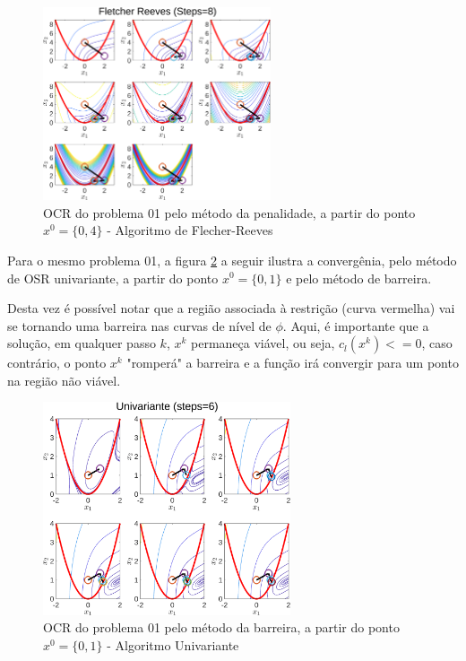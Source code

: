 \documentclass[10pt, a4paper]{article}
\begin{document}
\begin{figure}[H]
      \centering
      \includegraphics[width=0.6\textwidth]{fig02_P01_PEN_X2_FR.png}
      \caption{OCR do problema 01 pelo m\'etodo da penalidade, a partir do ponto $x^0=\{0,4\}$ - Algoritmo de Flecher-Reeves}
      \label{fig:fig02}
\end{figure}

Para o mesmo problema 01, a figura \ref{fig:fig03} a seguir ilustra a converg\^enia, pelo m\'etodo de OSR univariante, a partir do ponto $x^0=\{0,1\}$ e pelo m\'etodo de barreira.

Desta vez \'e poss\'ivel notar que a regi\~ao associada \`a restri\c c\~ao (curva vermelha) vai se tornando uma barreira nas curvas de n\'ivel de $\phi$. Aqui, \'e importante que a solu\c c\~ao, em qualquer passo $k$, $x^k$ permane\c ca vi\'avel, ou seja, $c_l(x^k)<=0$, caso contr\'ario, o ponto $x^k$ "romper\'a" a barreira e a fun\c c\~ao ir\'a convergir para um ponto na regi\~ao n\~ao vi\'avel.

\begin{figure}[H]
      \centering
      \includegraphics[width=0.65\textwidth]{fig03_P01_BAR_X1_UNI.png}
      \caption{OCR do problema 01 pelo m\'etodo da barreira, a partir do ponto $x^0=\{0,1\}$ - Algoritmo Univariante}
      \label{fig:fig03}
\end{figure}
\end{document}
